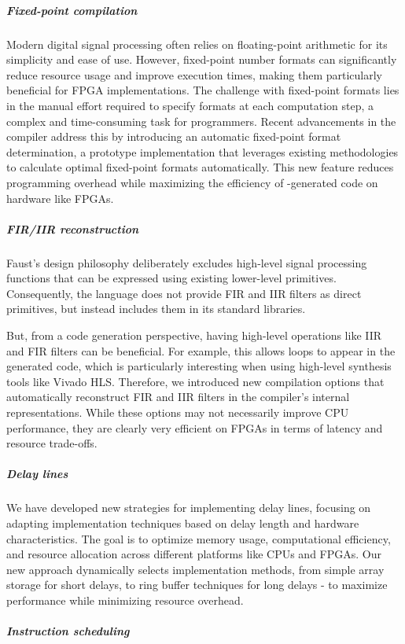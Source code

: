 \subparagraph{Fixed-point compilation}

Modern digital signal processing often relies on floating-point
arithmetic for its simplicity and ease of use. However, fixed-point
number formats can significantly reduce resource usage and improve
execution times, making them particularly beneficial for FPGA
implementations. The challenge with fixed-point formats lies in the
manual effort required to specify formats at each computation step, a
complex and time-consuming task for programmers. Recent advancements in
the \F{} compiler address this by introducing an automatic fixed-point
format determination, a prototype implementation that leverages existing
methodologies to calculate optimal fixed-point formats automatically.
This new feature reduces programming overhead while maximizing the
efficiency of \F{}-generated code on hardware like FPGAs.

\subparagraph{FIR/IIR reconstruction}

Faust's design philosophy deliberately excludes high-level signal processing functions that can be expressed using existing lower-level primitives. Consequently, the language does not provide FIR and IIR filters as direct primitives, but instead includes them in its standard libraries.

But, from a code generation perspective, having high-level operations like IIR and FIR filters can be beneficial. For example, this allows loops to appear in the generated code, which is particularly interesting when using high-level synthesis tools like Vivado HLS. Therefore, we introduced new compilation options that automatically reconstruct FIR and IIR filters in the compiler's internal representations. While these options may not necessarily improve CPU performance, they are clearly very efficient on FPGAs in terms of latency and resource trade-offs.

\subparagraph{Delay lines}

We have developed new strategies for implementing delay lines, focusing on adapting implementation techniques based on delay length and hardware characteristics. The goal is to optimize memory usage, computational efficiency, and resource allocation across different platforms like CPUs and FPGAs. Our new approach dynamically selects implementation methods, from simple array storage for short delays, to ring buffer techniques for long delays - to maximize performance while minimizing resource overhead.

\subparagraph{Instruction scheduling}

